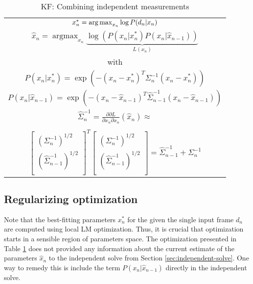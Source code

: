 \begin{table}[!h] 
\centering
\caption{KF: Combining independent measurements\label{tab:kf-like}} 
\begin{tabular}{|c|}
\hline
$x_n^* = \operatorname*{arg\,max}_{x_n} \log P(d_n|x_n)$ \\
$\hat{x}_n = \operatorname{argmax}_{x_n} \underbrace{\log \left( P(x_n|x_n^*) P(x_n |\hat{x}_{n - 1}) \right)}_{L(x_n)}$\\
with \\
$P(x_n |x_n^*) = \exp \left( - (x_n - x_n^* )^T \Sigma_n^{-1}(x_n - x_n^* )\right)$ \\
$P(x_n |\hat{x}_{n - 1}) = \exp \left( - (x_n - \hat{x}_{n - 1} )^T \hat{\Sigma}_{n - 1}^{-1} (x_n - \hat{x}_{n - 1} )\right)$ \\	

$\hat{\Sigma}_n^{-1} = \frac{\partial \partial L}{\partial x_n \partial x_n}(\hat{x}_n) \approx $ \\
\\
$\left[
	\begin{array}{cc}
		\left(\Sigma_n^{-1}\right)^{1/2} \\
		\left(\hat{\Sigma}_{n - 1}^{-1}\right)^{1/2} \\
	\end{array}
\right]^T 
\left[
	\begin{array}{c}
		\left(\Sigma_n^{-1}\right)^{1/2} \\
		\left(\hat{\Sigma}_{n - 1}^{-1}\right)^{1/2} \\
	\end{array}
\right] = \hat{\Sigma}_{n-1}^{-1}  + \Sigma_{n}^{-1}$ \\

\hline
\end{tabular}
\end{table}

\subsection{Regularizing optimization}

Note that the best-fitting parameters $x_n^*$ for the given the single input frame $d_n$ are computed using local LM optimization. Thus, it is crucial that optimization starts in a sensible region of parameters space. The optimization presented in Table \ref{tab:kf-like} does not provided any information about the current estimate of the parameters $\hat{x}_n$ to the independent solve from Section \ref{sec:independent-solve}. One way to remedy this is include the term $P(x_n |\hat{x}_{n - 1})$ directly in the independent solve.

